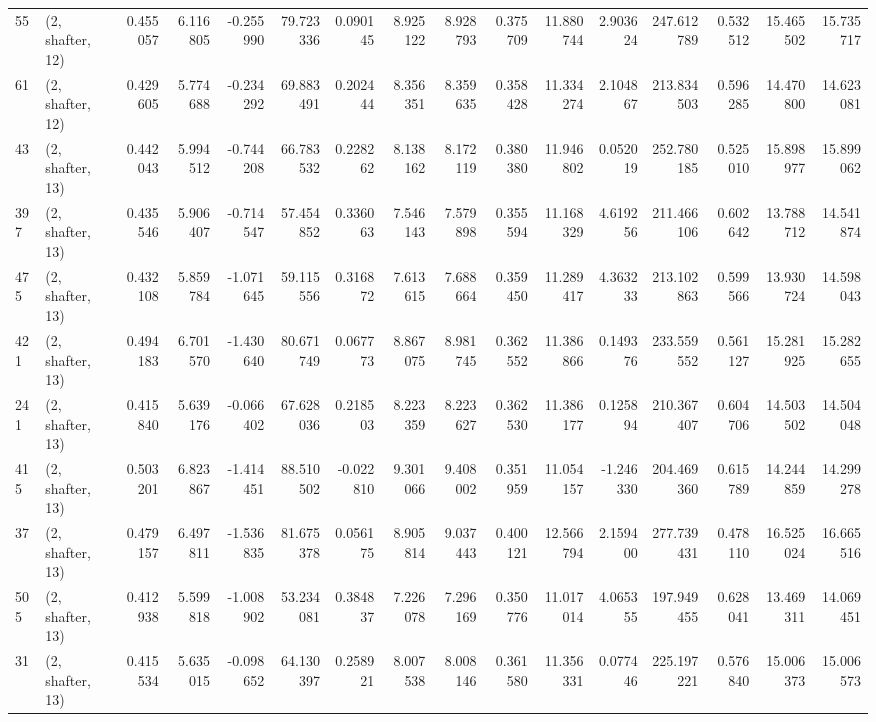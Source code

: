 \begin{tabular}{llrrrrrrrrrrrrrr}
55  &  (2, shafter, 12) &   0.455057 &   6.116805 &  -0.255990 &    79.723336 &   0.090145 &   8.925122 &   8.928793 &  0.375709 &  11.880744 &   2.903624 &   247.612789 &  0.532512 &  15.465502 &  15.735717 \\
61  &  (2, shafter, 12) &   0.429605 &   5.774688 &  -0.234292 &    69.883491 &   0.202444 &   8.356351 &   8.359635 &  0.358428 &  11.334274 &   2.104867 &   213.834503 &  0.596285 &  14.470800 &  14.623081 \\
43  &  (2, shafter, 13) &   0.442043 &   5.994512 &  -0.744208 &    66.783532 &   0.228262 &   8.138162 &   8.172119 &  0.380380 &  11.946802 &   0.052019 &   252.780185 &  0.525010 &  15.898977 &  15.899062 \\
397 &  (2, shafter, 13) &   0.435546 &   5.906407 &  -0.714547 &    57.454852 &   0.336063 &   7.546143 &   7.579898 &  0.355594 &  11.168329 &   4.619256 &   211.466106 &  0.602642 &  13.788712 &  14.541874 \\
475 &  (2, shafter, 13) &   0.432108 &   5.859784 &  -1.071645 &    59.115556 &   0.316872 &   7.613615 &   7.688664 &  0.359450 &  11.289417 &   4.363233 &   213.102863 &  0.599566 &  13.930724 &  14.598043 \\
421 &  (2, shafter, 13) &   0.494183 &   6.701570 &  -1.430640 &    80.671749 &   0.067773 &   8.867075 &   8.981745 &  0.362552 &  11.386866 &   0.149376 &   233.559552 &  0.561127 &  15.281925 &  15.282655 \\
241 &  (2, shafter, 13) &   0.415840 &   5.639176 &  -0.066402 &    67.628036 &   0.218503 &   8.223359 &   8.223627 &  0.362530 &  11.386177 &   0.125894 &   210.367407 &  0.604706 &  14.503502 &  14.504048 \\
415 &  (2, shafter, 13) &   0.503201 &   6.823867 &  -1.414451 &    88.510502 &  -0.022810 &   9.301066 &   9.408002 &  0.351959 &  11.054157 &  -1.246330 &   204.469360 &  0.615789 &  14.244859 &  14.299278 \\
37  &  (2, shafter, 13) &   0.479157 &   6.497811 &  -1.536835 &    81.675378 &   0.056175 &   8.905814 &   9.037443 &  0.400121 &  12.566794 &   2.159400 &   277.739431 &  0.478110 &  16.525024 &  16.665516 \\
505 &  (2, shafter, 13) &   0.412938 &   5.599818 &  -1.008902 &    53.234081 &   0.384837 &   7.226078 &   7.296169 &  0.350776 &  11.017014 &   4.065355 &   197.949455 &  0.628041 &  13.469311 &  14.069451 \\
31  &  (2, shafter, 13) &   0.415534 &   5.635015 &  -0.098652 &    64.130397 &   0.258921 &   8.007538 &   8.008146 &  0.361580 &  11.356331 &   0.077446 &   225.197221 &  0.576840 &  15.006373 &  15.006573 \\

\end{tabular}
